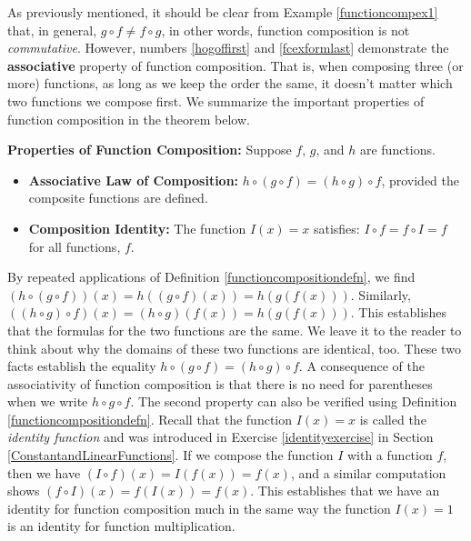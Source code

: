 As previously mentioned, it should be clear from  Example \ref{functioncompex1} that, in general, $g \circ f \neq f \circ g$, in other words, function composition is not \textit{commutative}.  However, numbers \ref{hogoffirst} and  \ref{fcexformlast} demonstrate the  \textbf{associative} property of function composition.  That is, when composing three (or more) functions, as long as we keep the order the same, it doesn't matter which two functions we compose first.  We summarize the important properties of function composition in the theorem below.

\begin{tcolorbox}
\begin{thm}\label{functioncompprops}  \textbf{Properties of Function Composition:} Suppose $f$, $g$, and $h$ are functions.  

\begin{itemize}

\item  \textbf{Associative Law of Composition:} $h \circ (g \circ f) = (h \circ g) \circ f$, provided the composite functions are defined.

\item  \textbf{Composition Identity:}  The function $I(x) = x$ satisfies:  $ I \circ f = f \circ I =f$ for all functions, $f$.

\end{itemize}

\end{thm}
\end{tcolorbox}

By repeated applications of Definition \ref{functioncompositiondefn}, we find  $(h \circ (g \circ f))(x) = h((g \circ f)(x)) = h(g(f(x)))$.  Similarly, $((h \circ g) \circ f)(x) = (h \circ g)(f(x)) = h(g(f(x)))$.  This establishes that the formulas for the two functions are the same.  We leave it to the reader to think about why the domains of these two functions are identical, too.  These two facts establish the equality $h \circ (g \circ f) = (h \circ g) \circ f$.  A consequence of the associativity of function composition is that there is no need for parentheses when we write $h \circ g \circ f$. The second property can also be verified using Definition \ref{functioncompositiondefn}.  Recall that the function $I(x) = x$ is called the  \textit{identity function} and was introduced in Exercise  \ref{identityexercise} in Section \ref{ConstantandLinearFunctions}.  If we compose the function $I$ with a function $f$, then we have $(I \circ f)(x) = I(f(x)) = f(x)$, and a similar computation shows $(f\circ I)(x) = f(I(x)) = f(x)$. This establishes that we have an identity for function composition much in the same way the function $I(x) = 1$ is an identity for function multiplication. 

